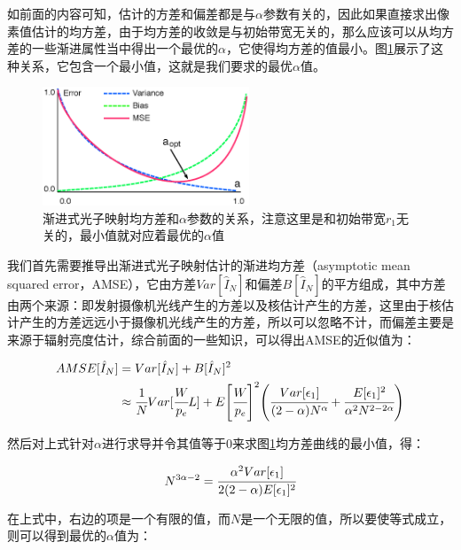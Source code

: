 如前面的内容可知，估计的方差和偏差都是与$\alpha$参数有关的，因此如果直接求出像素值估计的均方差，由于均方差的收敛是与初始带宽无关的，那么应该可以从均方差的一些渐进属性当中得出一个最优的$\alpha$，它使得均方差的值最小。图\ref{f:pm-opt-a}展示了这种关系，它包含一个最小值，这就是我们要求的最优$\alpha$值。

\begin{figure}
	\sidecaption
	\includegraphics[width=0.55\textwidth]{figures/pm/opt-a}
	\caption{渐进式光子映射均方差和$\alpha$参数的关系，注意这里是和初始带宽$r_1$无关的，最小值就对应着最优的$\alpha$值}
	\label{f:pm-opt-a}
\end{figure}

我们首先需要推导出渐进式光子映射估计的渐进均方差（asymptotic mean squared error，AMSE），它由方差$Var[\hat{I}_N]$和偏差$B[\hat{I}_N]$的平方组成，其中方差由两个来源：即发射摄像机光线产生的方差以及核估计产生的方差，这里由于核估计产生的方差远远小于摄像机光线产生的方差，所以可以忽略不计，而偏差主要是来源于辐射亮度估计，综合前面的一些知识，可以得出AMSE的近似值为：

\begin{equation}\label{e:pm-mse}
\begin{aligned}
	AMSE[\hat{I}_N]&=Var[\hat{I}_N]+B[\hat{I}_N]^{2}\\
	&\approx \cfrac{1}{N}Var[ \cfrac{W}{p_e}L]+E\Biggl[ \cfrac{W}{p_e}\Biggl]^{2}\Biggl( \cfrac{Var[\epsilon_1]}{(2-\alpha)N^{\alpha}}+ \cfrac{E[\epsilon_1]^{2}}{\alpha^{2}N^{2-2\alpha}}\Biggl)
\end{aligned}
\end{equation}

然后对上式针对$\alpha$进行求导并令其值等于0来求图\ref{f:pm-opt-a}均方差曲线的最小值，得：

\begin{equation}
	N^{3\alpha-2}= \cfrac{\alpha^{2}Var[\epsilon_1]}{2(2-\alpha)E[\epsilon_1]^{2}}
\end{equation}

在上式中，右边的项是一个有限的值，而$N$是一个无限的值，所以要使等式成立，则可以得到最优的$\alpha$值为：

